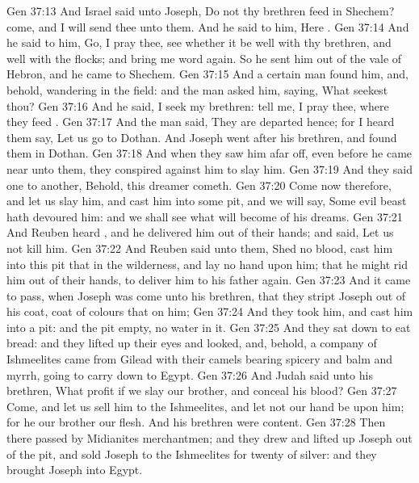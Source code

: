 \vs Gen 37:13 And Israel said unto Joseph, Do not thy brethren feed  in Shechem? come, and I will send thee unto them. And he said to him, Here .
\vs Gen 37:14 And he said to him, Go, I pray thee, see whether it be well with thy brethren, and well with the flocks; and bring me word again. So he sent him out of the vale of Hebron, and he came to Shechem.
\vs Gen 37:15 And a certain man found him, and, behold,  wandering in the field: and the man asked him, saying, What seekest thou?
\vs Gen 37:16 And he said, I seek my brethren: tell me, I pray thee, where they feed .
\vs Gen 37:17 And the man said, They are departed hence; for I heard them say, Let us go to Dothan. And Joseph went after his brethren, and found them in Dothan.
\vs Gen 37:18 And when they saw him afar off, even before he came near unto them, they conspired against him to slay him.
\vs Gen 37:19 And they said one to another, Behold, this dreamer cometh.
\vs Gen 37:20 Come now therefore, and let us slay him, and cast him into some pit, and we will say, Some evil beast hath devoured him: and we shall see what will become of his dreams.
\vs Gen 37:21 And Reuben heard , and he delivered him out of their hands; and said, Let us not kill him.
\vs Gen 37:22 And Reuben said unto them, Shed no blood,  cast him into this pit that  in the wilderness, and lay no hand upon him; that he might rid him out of their hands, to deliver him to his father again.
\vs Gen 37:23 And it came to pass, when Joseph was come unto his brethren, that they stript Joseph out of his coat,  coat of  colours that  on him;
\vs Gen 37:24 And they took him, and cast him into a pit: and the pit  empty,  no water in it.
\vs Gen 37:25 And they sat down to eat bread: and they lifted up their eyes and looked, and, behold, a company of Ishmeelites came from Gilead with their camels bearing spicery and balm and myrrh, going to carry  down to Egypt.
\vs Gen 37:26 And Judah said unto his brethren, What profit  if we slay our brother, and conceal his blood?
\vs Gen 37:27 Come, and let us sell him to the Ishmeelites, and let not our hand be upon him; for he  our brother  our flesh. And his brethren were content.
\vs Gen 37:28 Then there passed by Midianites merchantmen; and they drew and lifted up Joseph out of the pit, and sold Joseph to the Ishmeelites for twenty  of silver: and they brought Joseph into Egypt.
